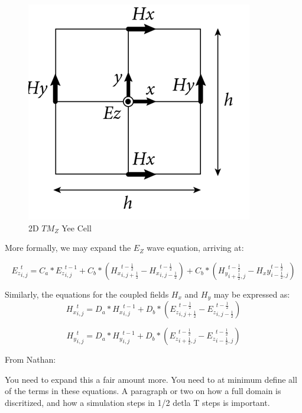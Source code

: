 \begin{figure}[H]
	\centering
	\includegraphics{yee-cell-ez.png}
	\caption{2D $TM_Z$ Yee Cell}
	\label{fig:yeecell}
\end{figure}

More formally, we may expand the $E_Z$ wave equation, arriving at:

\begin{equation} \label{eq:ezupdate}
{E_z}_{i,j}^{t} = C_a * {E_z}_{i,j}^{t-1} 
+ C_b * ({H_x}_{i,j+\frac{1}{2}}^{t-\frac{1}{2}} - {H_x}_{i,j-\frac{1}{2}}^{t-\frac{1}{2}})
+ C_b * ({H_y}_{i+\frac{1}{2},j}^{t-\frac{1}{2}} - {H_xy}_{i-\frac{1}{2},j}^{t-\frac{1}{2}})
\end{equation}

Similarly, the equations for the coupled fields $H_x$ and $H_y$ may be expressed as:
\begin{equation} \label{eq:hxupdate}
{H_x}_{i,j}^t = D_a * {H_x}_{i,j}^{t-1} + D_b * (
{E_z}_{i,j+\frac{1}{2}}^{t-\frac{1}{2}} 
-
{E_z}_{i,j-\frac{1}{2}}^{t-\frac{1}{2}}
)  
\end{equation}

\begin{equation} \label{eq:hyupdate}
{H_y}_{i,j}^t = D_a * {H_y}_{i,j}^{t-1} + D_b * (
{E_z}_{i+\frac{1}{2},j}^{t-\frac{1}{2}} 
-
{E_z}_{i-\frac{1}{2},j}^{t-\frac{1}{2}}
)  
\end{equation}

\iffalse
From Nathan:

You need to expand this a fair amount more.  You need to at minimum define all of the terms in these equations.  A paragraph or two on how a full domain is discritized, and how a simulation steps in 1/2 detla T steps is important.  

